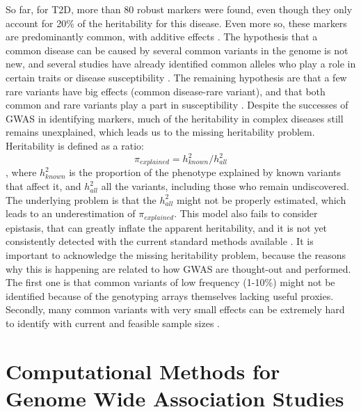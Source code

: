So far, for T2D, more than 80 robust markers were found, even though they only account for 20\% of the heritability for this disease. Even more so, these markers are predominantly common, with additive effects \cite{fuchsberger2016genetic}. The hypothesis that a common disease can be caused by several common variants in the genome is not new, and several studies have already identified common alleles who play a role in certain traits or disease susceptibility \cite{yang2010common, fuchsberger2016genetic, bush2012genome, reich2001allelic}. The remaining hypothesis are that a few rare variants have big effects (common disease-rare variant), and that both common and rare variants play a part in susceptibility \cite{prasad2015genetics, sanghera2012type}. Despite the successes of GWAS in identifying markers, much of the heritability in complex diseases still remains unexplained, which leads us to the missing heritability problem.\\
Heritability is defined as a ratio:\[\pi_{explained} = h^2_{known} / h^2_{all} \], where $h^2_{known}$ is the proportion of the phenotype explained by known variants that affect it, and $h^2_{all}$ all the variants, including those who remain undiscovered. The underlying problem is that the $h^2_{all}$ might not be properly estimated, which leads to an underestimation of $\pi_{explained}$. This model also fails to consider epistasis, that can greatly inflate the apparent heritability, and it is not yet consistently detected with the current standard methods available \cite{zuk2012mystery}. It is important to acknowledge the missing heritability problem, because the reasons why this is happening are related to how GWAS are thought-out and performed. The first one is that common variants of low frequency (1-10\%) might not be identified because of the genotyping arrays themselves lacking useful proxies. Secondly, many common variants with very small effects can be extremely hard to identify with current and feasible sample sizes \cite{lander2011initial, huyghe2013exome}. 

\section{Computational Methods for Genome Wide Association Studies}

